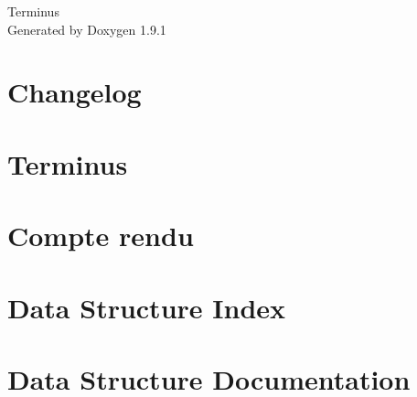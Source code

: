 \let\mypdfximage\pdfximage\def\pdfximage{\immediate\mypdfximage}\documentclass[twoside]{book}
\newcommand{\+}{\discretionary{\mbox{\scriptsize$\hookleftarrow$}}{}{}}
\newcommand{\clearemptydoublepage}{%
  \newpage{\pagestyle{empty}\cleardoublepage}%
}
\begin{document}
\raggedbottom

\hypersetup{pageanchor=false,
             bookmarksnumbered=true,
             pdfencoding=unicode
            }
\begin{titlepage}
\vspace*{7cm}
\begin{center}%
{\Large Terminus }\\
\vspace*{1cm}
{\large Generated by Doxygen 1.9.1}\\
\end{center}
\end{titlepage}
\clearemptydoublepage
{}
\tableofcontents
\clearemptydoublepage
{}
\hypersetup{pageanchor=true}

\chapter{Changelog}
\label{md_CHANGELOG}

\chapter{Terminus}
\label{md_README}

\chapter{Compte rendu}
\label{md_report}

\chapter{Data Structure Index}

\chapter{Data Structure Documentation}





\backmatter
\newpage
{}
\clearemptydoublepage
{}
\printindex
\end{document}
